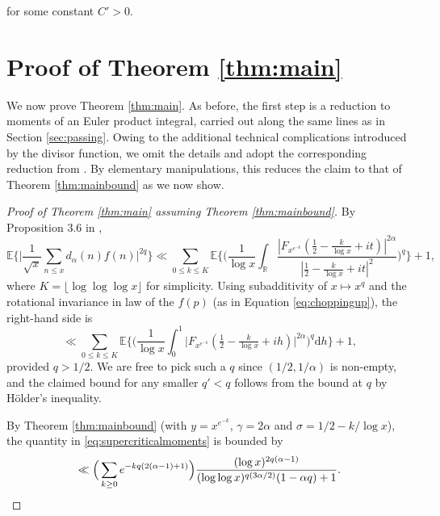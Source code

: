 \documentclass{amsart}
\theoremstyle{definition}
\theoremstyle{remark}
\newtheorem{remark}[theorem]{Remark}
\numberwithin{equation}{section}
\begin{document}
for some constant $C'> 0$.

\section{Proof of Theorem \ref{thm:main}}\label{sec:supercritical}

We now prove Theorem \ref{thm:main}. As before, the first step is a reduction to moments of an Euler product integral, carried out along the same lines as in Section \ref{sec:passing}. Owing to the additional technical complications introduced by the divisor function, we omit the details and adopt the corresponding reduction from \cite{Gerspach}. By elementary manipulations, this reduces the claim to that of Theorem \ref{thm:mainbound} as we now show.

\begin{proof}[Proof of Theorem \ref{thm:main} assuming Theorem \ref{thm:mainbound}]
By Proposition 3.6 in \cite{Gerspach}, 
\[
    \mathbb{E}\bigg\{\bigg|\frac{1}{\sqrt{x}}\sum_{n\leq x}d_\alpha(n)f(n)\bigg|^{2q}\bigg\}\ll \sum_{0\leq k\leq K} \mathbb{E}\bigg\{\bigg(\frac{1}{\log x}\int_{\mathbb{R}}\frac{|F_{x^{e^{-k}}}(\tfrac{1}{2}-\tfrac{k}{\log x}+it)|^{2\alpha}}{|\tfrac{1}{2}-\tfrac{k}{\log x}+it|^2}\bigg)^q\bigg\}+1,
\]
where $K=\lfloor \log\log\log x\rfloor$ for simplicity. Using subadditivity of $x\mapsto x^q$ and the rotational invariance in law of the $f(p)$ (as in Equation \eqref{eq:choppingup}), the right-hand side is
\begin{equation}\label{eq:supercriticalmoments}
    \ll \sum_{0\leq k\leq K} \mathbb{E}\bigg\{\bigg(\frac{1}{\log x}\int_{0}^1{\big|F_{x^{e^{-k}}}(\tfrac{1}{2}-\tfrac{k}{\log x}+ih)\big|^{2\alpha}}\bigg)^q\mathrm{d}h\bigg\}+1,
\end{equation}
provided $q>1/2$. We are free to pick such a $q$ since $(1/2,1/\alpha)$ is non-empty, and the claimed bound for any smaller $q'<q$ follows from the bound at $q$ by Hölder's inequality.

By Theorem \ref{thm:mainbound} (with $y=x^{e^{-k}}$, $\gamma=2\alpha$ and $\sigma=1/2-k/\log x$), the quantity in \eqref{eq:supercriticalmoments} is bounded by
\[
    \ll \Big(\sum_{k\geq 0} e^{-kq(2(\alpha-1)+1)}\Big)\frac{(\log x)^{2q(\alpha-1)}}{(\log\log x)^{q(3\alpha/2)}(1-\alpha q)+1}.\qedhere
\]
\end{proof}
\end{document}
